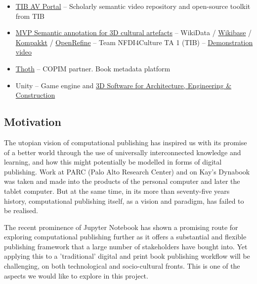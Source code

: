 \documentclass{article}
\begin{document}
\begin{itemize}
\begin{itemize}
\item \href{https://av.tib.eu/ }{TIB AV Portal} – Scholarly semantic video repository and open-source toolkit from TIB


\item \href{https://mvp.enrich-nfdi4culture.wiki/wiki/Main_Page}{MVP Semantic annotation for 3D cultural artefacts} – WikiData / \href{https://wikiba.se/}{Wikibase} / \href{https://kompakkt.de/home}{Kompakkt} / \href{https://openrefine.org/}{OpenRefine} – Team NFDI4Culture TA 1 (TIB) – \href{https://drive.google.com/file/d/1Umn2JS_-GEQONIdJ_ttlThl1VkwUwpae/view}{Demonstration video} 


\item \href{https://thoth.pub/}{Thoth} – COPIM partner. Book metadata platform


\item Unity – Game engine and \href{https://unity.com/solutions/architecture-engineering-construction}{3D Software for Architecture, Engineering \& Construction} 


\end{itemize}

\end{itemize}

\subsection{Motivation}\label{H2831995}



The utopian vision of computational publishing has inspired us with its promise of a better world through the use of universally interconnected knowledge and learning, and how this might potentially be modelled in forms of digital publishing. Work at PARC (Palo Alto Research Center) and on Kay's Dynabook was taken and made into the products of the personal computer and later the tablet computer. But at the same time, in its more than seventy-five years history, computational publishing itself, as a vision and paradigm, has failed to be realised. 


The recent prominence of Jupyter Notebook has shown a promising route for exploring computational publishing further as it offers a substantial and flexible publishing framework that a large number of stakeholders have bought into. Yet applying this to a 'traditional' digital and print book publishing workflow will be challenging, on both technological and socio-cultural fronts. This is one of the aspects we would like to explore in this project.
\end{document}
